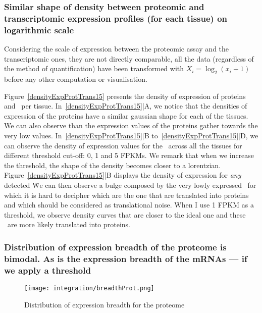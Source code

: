 \subsubsection{Similar shape of density between proteomic and transcriptomic
expression profiles (for each tissue) on logarithmic scale}

Considering the scale of expression between the proteomic assay and the
transcriptomic ones, they are not directly comparable, all the data (regardless
of the method of quantification) have been transformed
with $X_{i}=\log_{2} (x_{i}+1)$
before any other computation or visualisation.


Figure~\ref{densityExpProtTrans15} presents the density of expression
of proteins and \mRNAs\ per tissue. In~\ref{densityExpProtTrans15}|A,
we notice that the densities of expression of the proteins have a similar gaussian
shape for each of the tissues. We can also observe than the expression values
of the proteins gather towards the very low values.
In~\ref{densityExpProtTrans15}|B to~\ref{densityExpProtTrans15}|D, we can observe
the density of expression values for the \mRNAs\ across all the tissues for
different threshold cut-off: 0, 1 and 5 \glspl{FPKM}.
We remark that when we increase the threshold, the shape
of the density becomes closer to a lorentzian. Figure~\ref{densityExpProtTrans15}|B
displays the density of expression for \emph{any} detected \mRNA\. We can
then observe a bulge composed by the very lowly expressed \mRNAs\, for which it
is hard to decipher which are the one that are translated into proteins and which
should be considered as translational noise. When I use 1 \gls{FPKM} as a threshold,
we observe density curves that are closer to the ideal one and these \mRNAs\ are
more likely translated into proteins.



\subsubsection{Distribution of expression breadth of the proteome is bimodal. As is
the expression breadth of the mRNAs --- if we apply a threshold}
\label{sec:IntegrationProteinBimodalExpre}

\begin{figure}
    \texttt{[image: integration/breadthProt.png]}\centering
    \caption{Distribution of expression breadth for the proteome\label{breadthProt}}
\end{figure}

